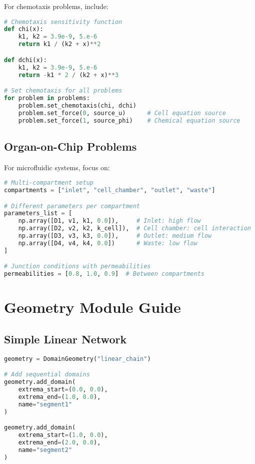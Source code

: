 \documentclass[11pt,a4paper]{article}
\begin{document}
For chemotaxis problems, include:

\begin{lstlisting}[language=Python, caption={Keller-Segel Problem Setup}]
# Chemotaxis sensitivity function
def chi(x):
    k1, k2 = 3.9e-9, 5.e-6
    return k1 / (k2 + x)**2

def dchi(x):
    k1, k2 = 3.9e-9, 5.e-6
    return -k1 * 2 / (k2 + x)**3

# Set chemotaxis for all problems
for problem in problems:
    problem.set_chemotaxis(chi, dchi)
    problem.set_force(0, source_u)      # Cell equation source
    problem.set_force(1, source_phi)    # Chemical equation source
\end{lstlisting}

\subsection{Organ-on-Chip Problems}

For microfluidic systems, focus on:

\begin{lstlisting}[language=Python, caption={Organ-on-Chip Problem Setup}]
# Multi-compartment setup
compartments = ["inlet", "cell_chamber", "outlet", "waste"]

# Different parameters per compartment
parameters_list = [
    np.array([D1, v1, k1, 0.0]),     # Inlet: high flow
    np.array([D2, v2, k2, k_cell]),  # Cell chamber: cell interaction
    np.array([D3, v3, k3, 0.0]),     # Outlet: medium flow
    np.array([D4, v4, k4, 0.0])      # Waste: low flow
]

# Junction conditions with permeabilities
permeabilities = [0.8, 1.0, 0.9]  # Between compartments
\end{lstlisting}

\section{Geometry Module Guide}

\subsection{Simple Linear Network}

\begin{lstlisting}[language=Python, caption={Linear Network Geometry}]
geometry = DomainGeometry("linear_chain")

# Add sequential domains
geometry.add_domain(
    extrema_start=(0.0, 0.0),
    extrema_end=(1.0, 0.0),
    name="segment1"
)

geometry.add_domain(
    extrema_start=(1.0, 0.0),
    extrema_end=(2.0, 0.0),
    name="segment2"
)
\end{lstlisting}
\end{document}
